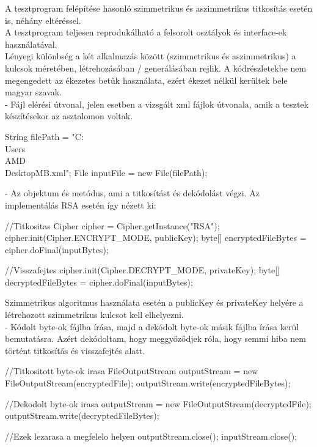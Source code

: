 \vspace{10pt} \noindent A tesztprogram felépítése hasonló szimmetrikus és aszimmetrikus titkosítás esetén is, néhány eltéréssel.
\\A tesztprogram teljesen reprodukálható a felsorolt osztályok és interface-ek használatával.
\vspace{5pt}\\ Lényegi különbség a két alkalmazás között (szimmetrikus és aszimmetrikus) a kulcsok méretében, létrehozásában / generálásában rejlik. A kódrészletekbe nem megengedett az ékezetes betűk használata, ezért ékezet nélkül kerültek bele magyar szavak.
\vspace{5pt}\\ - Fájl elérési útvonal, jelen esetben a vizsgált xml fájlok útvonala, amik a tesztek készítésekor az asztalomon voltak.
\begin{java}
String filePath = "C:\\Users\\AMD\\Desktop\2MB.xml";
File inputFile = new File(filePath);
\end{java}
\vspace{5pt}- Az objektum és metódus, ami a titkosítást és dekódolást végzi. Az implementálás RSA esetén így nézett ki:
\begin{java}
//Titkositas
Cipher cipher = Cipher.getInstance("RSA");
cipher.init(Cipher.ENCRYPT_MODE, publicKey);
byte[] encryptedFileBytes = cipher.doFinal(inputBytes);

//Visszafejtes
cipher.init(Cipher.DECRYPT_MODE, privateKey);
byte[] decryptedFileBytes = cipher.doFinal(inputBytes);
\end{java}
Szimmetrikus algoritmus használata esetén a publicKey és privateKey helyére a létrehozott szimmetrikus kulcsot kell elhelyezni.
\vspace{15pt}\\ - Kódolt byte-ok fájlba írása, majd a dekódolt byte-ok másik fájlba írása kerül bemutatásra. Azért dekódoltam, hogy meggyőződjek róla, hogy semmi hiba nem történt titkosítás és visszafejtés alatt.
\begin{java}
//Titkositott byte-ok irasa
FileOutputStream outputStream = 
			new FileOutputStream(encryptedFile);
outputStream.write(encryptedFileBytes);
	
//Dekodolt byte-ok irasa
outputStream = new FileOutputStream(decryptedFile);
outputStream.write(decryptedFileBytes);
	
//Ezek lezarasa a megfelelo helyen
outputStream.close();
inputStream.close();
\end{java}
